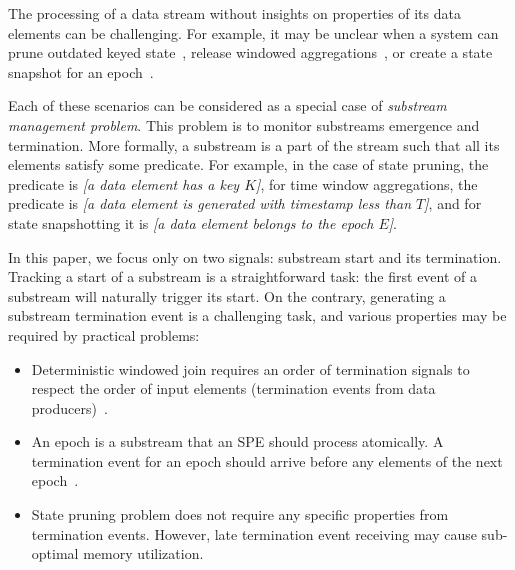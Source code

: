 \label {fs-acker-intro}

The processing of a data stream without insights on properties of its data elements can be challenging. For example, it may be unclear when a system can prune outdated keyed state~\cite{Tucker:2003:EPS:776752.776780}, release windowed aggregations~\cite{Begoli:2019:OSR:3299869.3314040}, or create a state snapshot for an epoch~\cite{Carbone:2017:SMA:3137765.3137777}.

Each of these scenarios can be considered as a special case of {\em substream management problem}. This problem is to monitor substreams emergence and termination. More formally, a substream is a part of the stream such that all its elements satisfy some predicate. For example, in the case of state pruning, the predicate is {\em [a data element has a key $K$]}, for time window aggregations, the predicate is {\em [a data element is generated with timestamp less than $T$]}, and for state snapshotting it is {\em [a data element belongs to the epoch $E$]}.

In this paper, we focus only on two signals: substream start and its termination. Tracking a start of a substream is a straightforward task: the first event of a substream will naturally trigger its start. On the contrary, generating a substream termination event is a challenging task, and various properties may be required by practical problems:
\begin{itemize}
    \item Deterministic windowed join requires an order of termination signals to respect the order of input elements (termination events from data producers)~\cite{najdataei2019stretch, gulisano2016scalejoin}.
    \item An epoch is a substream that an SPE should process atomically. A termination event for an epoch should arrive before any elements of the next epoch~\cite{2015arXiv150608603C}.
    \item State pruning problem does not require any specific properties from termination events. However, late termination event receiving may cause sub-optimal memory utilization.
\end{itemize}

